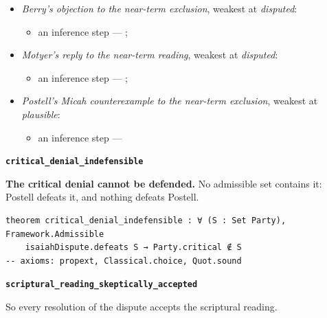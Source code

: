 \documentclass[11pt]{article}
\begin{document}
\begin{itemize}
\begin{itemize}
\item Read compositionally, Isaiah 7:14 anticipates a future, miraculous birth --- \cite[490--493]{postell-isaiah-messianic-2025}
\item Mary conceived Jesus while a virgin --- Matt 1:18-25; Luke 1:26-38; \cite[30--33]{brown-problem-virginal-conception-1972}
\item an inference step --- \cite[ad loc. Isa 7:14]{motyer-isaiah-1993}
\item an inference step --- \cite[9--10]{miravalle-meet-mary-2007}
\item an inference step --- \cite[490--493]{postell-isaiah-messianic-2025}
\item an inference step --- \cite[ad loc. Matt 1:23]{france-matthew-2007}
\end{itemize}
\item \emph{Berry's objection to the near-term exclusion}, weakest at \emph{disputed}:
\begin{itemize}
\item an inference step --- \cite[1653--1654]{berry-virgin-birth-2003}; \cite[5]{compton-immanuel-prophecy-2007}
\end{itemize}
\item \emph{Motyer's reply to the near-term reading}, weakest at \emph{disputed}:
\begin{itemize}
\item an inference step --- \cite[124]{motyer-context-content-1970}; \cite[5]{compton-immanuel-prophecy-2007}
\end{itemize}
\item \emph{Postell's Micah counterexample to the near-term exclusion}, weakest at \emph{plausible}:
\begin{itemize}
\item an inference step --- \cite[481]{postell-isaiah-messianic-2025}
\end{itemize}
\end{itemize}
\par\medskip\noindent\textbf{\texttt{critical\_\allowbreak{}denial\_\allowbreak{}indefensible}}\par\nobreak\noindent
\textbf{The critical denial cannot be defended.} No admissible set contains it: Postell defeats it, and nothing defeats Postell.

{\small\begin{verbatim}
theorem critical_denial_indefensible : ∀ (S : Set Party), Framework.Admissible
    isaiahDispute.defeats S → Party.critical ∉ S
-- axioms: propext, Classical.choice, Quot.sound
\end{verbatim}}
\par\medskip\noindent\textbf{\texttt{scriptural\_\allowbreak{}reading\_\allowbreak{}skeptically\_\allowbreak{}accepted}}\par\nobreak\noindent
So every resolution of the dispute accepts the scriptural reading.
\end{document}

